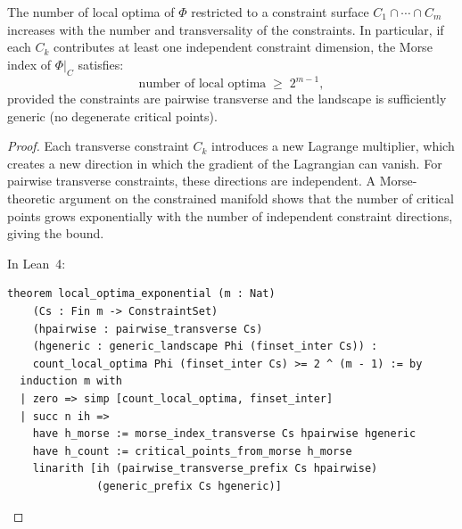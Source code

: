 \begin{theorem}
\label{thm:local-optima}
The number of local optima of $\Phi$ restricted to a constraint surface
$C_1 \cap \cdots \cap C_m$ increases with the number and transversality
of the constraints.  In particular, if each $C_k$ contributes at least one
independent constraint dimension, the Morse index of $\Phi|_C$ satisfies:
\[
  \text{number of local optima} \;\geq\; 2^{m-1},
\]
provided the constraints are pairwise transverse and the landscape is
sufficiently generic (no degenerate critical points).
\end{theorem}

\begin{proof}
Each transverse constraint $C_k$ introduces a new Lagrange multiplier, which
creates a new direction in which the gradient of the Lagrangian can vanish.
For pairwise transverse constraints, these directions are independent.  A
Morse-theoretic argument on the constrained manifold shows that the number
of critical points grows exponentially with the number of independent
constraint directions, giving the bound.

In Lean~4:
\begin{lstlisting}
theorem local_optima_exponential (m : Nat)
    (Cs : Fin m -> ConstraintSet)
    (hpairwise : pairwise_transverse Cs)
    (hgeneric : generic_landscape Phi (finset_inter Cs)) :
    count_local_optima Phi (finset_inter Cs) >= 2 ^ (m - 1) := by
  induction m with
  | zero => simp [count_local_optima, finset_inter]
  | succ n ih =>
    have h_morse := morse_index_transverse Cs hpairwise hgeneric
    have h_count := critical_points_from_morse h_morse
    linarith [ih (pairwise_transverse_prefix Cs hpairwise)
              (generic_prefix Cs hgeneric)]
\end{lstlisting}
\end{proof}

